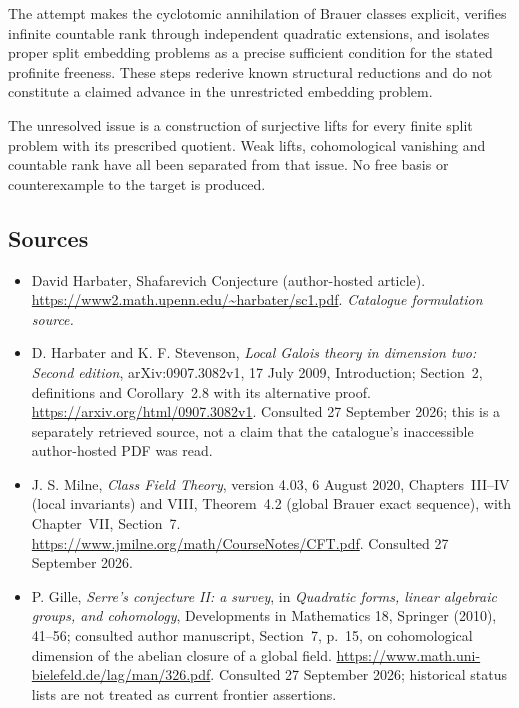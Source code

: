 \documentclass[11pt,a4paper]{article}
\numberwithin{equation}{section}
\begin{document}
The attempt makes the cyclotomic annihilation of Brauer classes explicit,
verifies infinite countable rank through independent quadratic
extensions, and isolates proper split embedding problems as a precise
sufficient condition for the stated profinite freeness. These steps
rederive known structural reductions and do not constitute a claimed
advance in the unrestricted embedding problem.

The unresolved issue is a construction of surjective lifts for every
finite split problem with its prescribed quotient. Weak lifts,
cohomological vanishing and countable rank have all been separated from
that issue. No free basis or counterexample to the target is produced.
\subsection{Sources}
\begin{itemize}\raggedright
\item[\textnormal{[S1]}]\hypertarget{source:30006802:1}{} David Harbater, Shafarevich Conjecture (author-hosted article).
\url{https://www2.math.upenn.edu/~harbater/sc1.pdf}.
{\small\textit{Catalogue formulation source.}}
\item[\textnormal{[E1]}]\hypertarget{extra:30006802:1}{}
D. Harbater and K. F. Stevenson, \emph{Local Galois theory in dimension
two: Second edition}, arXiv:0907.3082v1, 17 July 2009, Introduction;
Section~2, definitions and Corollary~2.8 with its alternative proof.
\url{https://arxiv.org/html/0907.3082v1}.
Consulted 27 September 2026; this is a separately retrieved source,
not a claim that the catalogue's inaccessible author-hosted PDF was read.
\item[\textnormal{[E2]}]\hypertarget{extra:30006802:2}{}
J. S. Milne, \emph{Class Field Theory}, version 4.03, 6 August 2020,
Chapters~III--IV (local invariants) and VIII, Theorem~4.2 (global Brauer
exact sequence), with Chapter~VII, Section~7.
\url{https://www.jmilne.org/math/CourseNotes/CFT.pdf}.
Consulted 27 September 2026.
\item[\textnormal{[E3]}]\hypertarget{extra:30006802:3}{}
P. Gille, \emph{Serre's conjecture II: a survey}, in \emph{Quadratic
forms, linear algebraic groups, and cohomology}, Developments in
Mathematics 18, Springer (2010), 41--56; consulted author manuscript,
Section~7, p.~15, on cohomological dimension of the abelian closure of a
global field. \url{https://www.math.uni-bielefeld.de/lag/man/326.pdf}.
Consulted 27 September 2026; historical status lists are not treated as
current frontier assertions.
\end{itemize}
\end{document}
